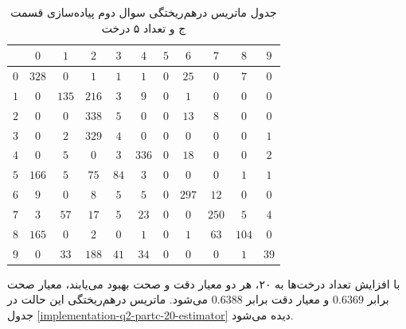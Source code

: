 \documentclass{article}
\begin{document}
\begin{table}[h]
    \centering
    \caption{جدول ماتریس درهم‌ریختگی سوال دوم پیاده‌سازی قسمت ج و تعداد ۵ درخت}
    \label{implementation-q2-partc-5-estimator}
    \begin{tabular}{c||c|c|c|c|c|c|c|c|c|c}
        & $0$ & $1$ & $2$ & $3$ & $4$ & $5$ & $6$ & $7$ & $8$ & $9$ \\
        \hline\hline
        $0$ & $328$ & $0$ & $1$ & $1$ & $1$ & $0$ & $25$ & $0$ & $7$ & $0$ \\
        \hline
        $1$ & $0$ & $135$ & $216$ & $3$ & $9$ & $0$ & $1$ & $0$ & $0$ & $0$ \\
        \hline
        $2$ & $0$ & $0$ & $338$ & $5$ & $0$ & $0$ & $13$ & $8$ & $0$ & $0$ \\
        \hline
        $3$ & $0$ & $2$ & $329$ & $4$ & $0$ & $0$ & $0$ & $0$ & $0$ & $1$ \\
        \hline
        $4$ & $0$ & $5$ & $0$ & $3$ & $336$ & $0$ & $18$ & $0$ & $0$ & $2$ \\
        \hline
        $5$ & $166$ & $5$ & $75$ & $84$ & $3$ & $0$ & $0$ & $0$ & $1$ & $1$ \\
        \hline
        $6$ & $9$ & $0$ & $8$ & $5$ & $5$ & $0$ & $297$ & $12$ & $0$ & $0$ \\
        \hline
        $7$ & $3$ & $57$ & $17$ & $5$ & $23$ & $0$ & $0$ & $250$ & $5$ & $4$ \\
        \hline
        $8$ & $165$ & $0$ & $2$ & $0$ & $1$ & $0$ & $1$ & $63$ & $104$ & $0$ \\
        \hline
        $9$ & $0$ & $33$ & $188$ & $41$ & $34$ & $0$ & $0$ & $0$ & $1$ & $39$
    \end{tabular}
\end{table}

با افزایش تعداد درخت‌ها به ۲۰، هر دو معیار دقت و صحت بهبود می‌یابند، معیار صحت برابر $0.6369$ و
معیار دقت برابر $0.6388$ می‌شود. ماتریس درهم‌ریختگی این حالت در جدول \ref{implementation-q2-partc-20-estimator}
دیده می‌شود.
\end{document}
